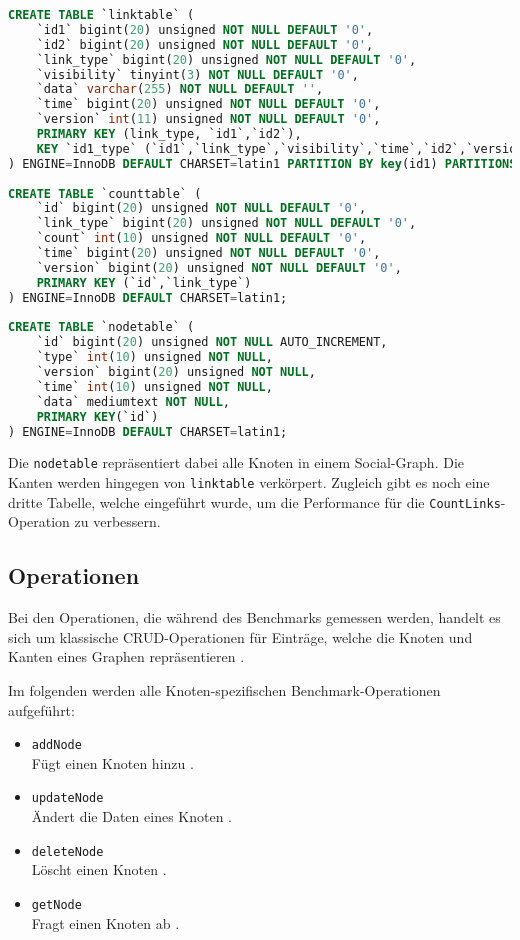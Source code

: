 \begin{lstlisting}[caption={Linkbench MySQL-Schema},language=SQL,label=src:linkbench_mysql]
CREATE TABLE `linktable` (
    `id1` bigint(20) unsigned NOT NULL DEFAULT '0',
    `id2` bigint(20) unsigned NOT NULL DEFAULT '0',
    `link_type` bigint(20) unsigned NOT NULL DEFAULT '0',
    `visibility` tinyint(3) NOT NULL DEFAULT '0',
    `data` varchar(255) NOT NULL DEFAULT '',
    `time` bigint(20) unsigned NOT NULL DEFAULT '0',
    `version` int(11) unsigned NOT NULL DEFAULT '0',
    PRIMARY KEY (link_type, `id1`,`id2`),
    KEY `id1_type` (`id1`,`link_type`,`visibility`,`time`,`id2`,`version`,`data`)
) ENGINE=InnoDB DEFAULT CHARSET=latin1 PARTITION BY key(id1) PARTITIONS 16;
    
CREATE TABLE `counttable` (
    `id` bigint(20) unsigned NOT NULL DEFAULT '0',
    `link_type` bigint(20) unsigned NOT NULL DEFAULT '0',
    `count` int(10) unsigned NOT NULL DEFAULT '0',
    `time` bigint(20) unsigned NOT NULL DEFAULT '0',
    `version` bigint(20) unsigned NOT NULL DEFAULT '0',
    PRIMARY KEY (`id`,`link_type`)
) ENGINE=InnoDB DEFAULT CHARSET=latin1;
    
CREATE TABLE `nodetable` (
    `id` bigint(20) unsigned NOT NULL AUTO_INCREMENT,
    `type` int(10) unsigned NOT NULL,
    `version` bigint(20) unsigned NOT NULL,
    `time` int(10) unsigned NOT NULL,
    `data` mediumtext NOT NULL,
    PRIMARY KEY(`id`)
) ENGINE=InnoDB DEFAULT CHARSET=latin1;
\end{lstlisting}
Die \texttt{nodetable} repräsentiert dabei alle Knoten in einem Social-Graph. Die Kanten werden hingegen von \texttt{linktable} verkörpert. Zugleich gibt es noch eine dritte Tabelle, welche eingeführt wurde, um die Performance für die \texttt{CountLinks}-Operation zu verbessern.

\subsection{Operationen}
\label{linkbench:operationen}
Bei den Operationen, die während des Benchmarks gemessen werden, handelt es sich um klassische CRUD-Operationen für Einträge, welche die Knoten und Kanten eines Graphen repräsentieren \cite{linkbench_paper}. 

Im folgenden werden alle Knoten-spezifischen Benchmark-Operationen aufgeführt:
\begin{itemize}
    \item \texttt{addNode}\\
    Fügt einen Knoten hinzu \cite{fb_linkbench_github}.
    \item \texttt{updateNode}\\
    Ändert die Daten eines Knoten \cite{fb_linkbench_github}.
    \item \texttt{deleteNode}\\
    Löscht einen Knoten \cite{fb_linkbench_github}.
    \item \texttt{getNode}\\
    Fragt einen Knoten ab \cite{fb_linkbench_github}.
\end{itemize}

